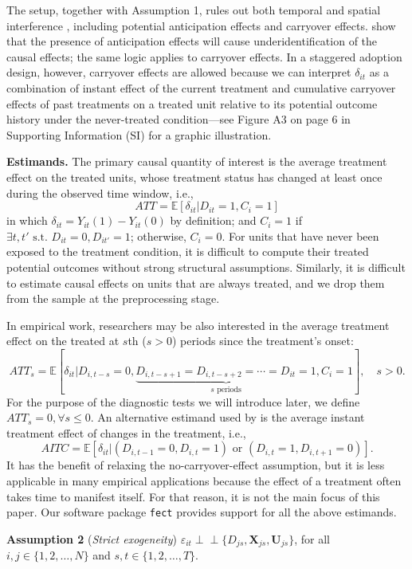 \documentclass[12pt]{article}
\newcommand{\indep}{\perp \!\!\! \perp}
\newcommand{\E}{\mathbb{E}}
\begin{document}
The setup, together with Assumption 1, rules out both temporal and spatial interference \citep{Wang2021-xo}, including potential anticipation effects and carryover effects. \citet{borusyak2020revisiting} show that the presence of anticipation effects will cause underidentification of the causal effects; the same logic applies to carryover effects.  In a staggered adoption design, however, carryover effects are allowed because we can interpret $\delta_{it}$ as a combination of instant effect of the current treatment and cumulative carryover effects of past treatments on a treated unit relative to its potential outcome history under the never-treated condition---see Figure A3 on page 6 in Supporting Information (SI) for a graphic illustration. 

\medskip\noindent\textbf{Estimands.} The primary causal quantity of interest is the average treatment effect on the treated units, whose treatment status has changed at least once during the observed time window, i.e., 
$$ATT = \E[\delta_{it}|D_{it}=1, C_{i} = 1]$$
in which $\delta_{it} = Y_{it}(1) - Y_{it}(0)$ by definition; and $C_{i} = 1$ if $\exists t,t' \text{ s.t. } D_{it} = 0, D_{it'}=1$; otherwise, $C_{i} = 0$. For units that have never been exposed to the treatment condition, it is difficult to compute their treated potential outcomes without strong structural assumptions. Similarly, it is difficult to estimate causal effects on units that are always treated, and we drop them from the sample at the preprocessing stage. 

In empirical work, researchers may be also interested in the average treatment effect on the treated at $s$th ($s>0$) periods since the treatment's onset:
$$ATT_{s} = \E[\delta_{it}| D_{i,t-s}=0, \underbrace{D_{i,t-s+1} = D_{i,t-s+2} = \cdots =  D_{it} = 1}_{s \text{ periods}}, C_i = 1],\quad s>0.$$
For the purpose of the diagnostic tests we will introduce later, we define $ATT_{s} = 0, \forall s\leq0$. An alternative estimand used by \citet{de_Chaisemartin2018-iw} is the average instant treatment effect of changes in the treatment, i.e.,
$$AITC =  \E[\delta_{it}| (D_{i,t-1}=0, D_{i,t} = 1) \text{ or } (D_{i,t}=1, D_{i,t+1} = 0)].$$
It has the benefit of relaxing the no-carryover-effect assumption, but it is less applicable in many empirical applications because the effect of a treatment often takes time to manifest itself. For that reason, it is not the main focus of this paper. Our software package \texttt{fect} provides support for all the above estimands.

\bigskip\noindent\textbf{Assumption 2} ({\it Strict exogeneity})
$\varepsilon_{it} \indep \{D_{js}, \mathbf{X}_{js}, \mathbf{U}_{js}\}$, for all $i,j \in \{1,2,\dots,N\}$ and $s,t \in \{1,2,\dots,T\}$.\bigskip
\end{document}
